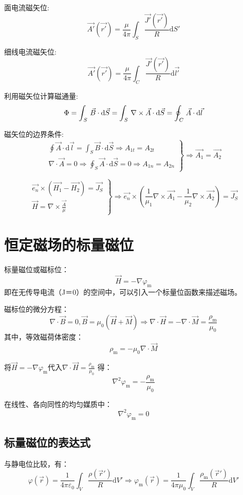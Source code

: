 面电流磁矢位:
\[ \vec{A'}(\vec{r'}) = \frac{\mu}{4\pi} \int_S \frac{\vec{J'}(\vec{r'})}{R} \mathrm{d}S' \]

细线电流磁矢位:
\[ \vec{A'}(\vec{r'}) = \frac{\mu}{4\pi} \int_C \frac{\vec{J'}(\vec{r'})}{R} \mathrm{d}\vec{l'} \]

利用磁矢位计算磁通量:
\[\Phi  = \int_{{\kern 1pt} S} {\,\vec B \cdot {\text{d}}\vec S}  = \int_{{\kern 1pt} S} {\,\nabla  \times \vec A \cdot {\text{d}}\vec S}  = \oint_{{\kern 1pt} C} {{\kern 1pt} \vec A \cdot {\text{d}}\vec l} \]

磁矢位的边界条件:
\[\left.
\begin{aligned}
\oint \vec{A}\cdot\mathrm{d}\vec{l} = \int_S \vec{B}\cdot\mathrm{d}\vec{S} \Rightarrow A_{1t} = A_{2t} \\
\nabla \cdot \vec{A} = 0 \Rightarrow \oint_S\vec{A}\cdot\mathrm{d}\vec{S} = 0 \Rightarrow A_{1n} = A_{2n}
\end{aligned}
\right\} \Rightarrow \vec{A_1} = \vec{A_2} \]

\[\left.
\begin{aligned}
\vec{e_n} \times (\vec{H_1} - \vec{H_2}) = \vec{J_S} \\
\vec{H} = \nabla \times \frac{\vec{A}}{\mu}
\end{aligned}
\right\} \Rightarrow \vec{e_n} \times ( \frac{1}{\mu_1}\nabla\times\vec{A_1} -  \frac{1}{\mu_2}\nabla\times\vec{A_2}) = \vec{J_S} \]

\section{恒定磁场的标量磁位}
标量磁位或磁标位：
\[\vec H =  - \nabla {\varphi _{\text{m}}}\]
即在无传导电流（J＝0）的空间中，可以引入一个标量位函数来描述磁场。

磁标位的微分方程：
\[\nabla  \cdot \vec B = 0,\vec B = {\mu _0}(\vec H + \vec M) \Rightarrow \nabla  \cdot \vec H =  - \nabla  \cdot \vec M = \frac{{{\rho _{\text{m}}}}}{{{\mu _0}}}\]
其中，等效磁荷体密度：
\[{\rho _{\text{m}}} =  - {\mu _0}\nabla  \cdot \vec M\]

将\(\vec H =  - \nabla {\varphi _{\text{m}}}\)代入\(\nabla  \cdot \vec H = \frac{{{\rho _{\text{m}}}}}{{{\mu _0}}}\)
得：
\[{\nabla ^2}{\varphi _{\text{m}}} =  - \frac{{{\rho _{\text{m}}}}}
{{{\mu _0}}}\]

在线性、各向同性的均匀媒质中：
\[{\nabla ^2}{\varphi _{\text{m}}} = 0\]

\subsection*{标量磁位的表达式}
与静电位比较，有：
\[\varphi (\vec r) = \frac{1}{4\pi\varepsilon_0}\int_V \frac{\rho (\vec r')}{R} \mathrm{d}V'\Rightarrow\varphi_\text{m}(\vec r) = \frac{1}{4\pi\mu_0}\int_V {\frac{\rho _\text{m}(\vec r')}{R}} \text{d}V'\]

